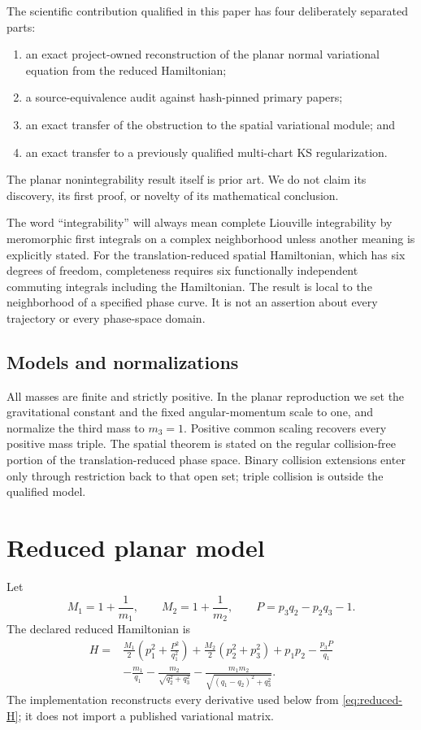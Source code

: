 \documentclass[11pt]{article}
\theoremstyle{definition}
\theoremstyle{remark}
\begin{document}
The scientific contribution qualified in this paper has four deliberately
separated parts:
\begin{enumerate}
  \item an exact project-owned reconstruction of the planar normal
    variational equation from the reduced Hamiltonian;
  \item a source-equivalence audit against hash-pinned primary papers;
  \item an exact transfer of the obstruction to the spatial variational
    module; and
  \item an exact transfer to a previously qualified multi-chart KS
    regularization.
\end{enumerate}
The planar nonintegrability result itself is prior art.  We do not claim its
discovery, its first proof, or novelty of its mathematical conclusion.

The word ``integrability'' will always mean complete Liouville integrability
by meromorphic first integrals on a complex neighborhood unless another
meaning is explicitly stated.  For the translation-reduced spatial
Hamiltonian, which has six degrees of freedom, completeness requires six
functionally independent commuting integrals including the Hamiltonian.
The result is local to the neighborhood of a specified phase curve.  It is
not an assertion about every trajectory or every phase-space domain.

\subsection{Models and normalizations}

All masses are finite and strictly positive.  In the planar reproduction we
set the gravitational constant and the fixed angular-momentum scale to one,
and normalize the third mass to \(m_3=1\).  Positive common scaling recovers
every positive mass triple.  The spatial theorem is stated on the regular
collision-free portion of the translation-reduced phase space.  Binary
collision extensions enter only through restriction back to that open set;
triple collision is outside the qualified model.

\section{Reduced planar model}
\label{sec:planar-model}

Let
\[
  M_1=1+\frac{1}{m_1},\qquad
  M_2=1+\frac{1}{m_2},\qquad
  P=p_3q_2-p_2q_3-1.
\]
The declared reduced Hamiltonian is
\begin{align}
H={}&\frac{M_1}{2}\left(p_1^2+\frac{P^2}{q_1^2}\right)
  +\frac{M_2}{2}(p_2^2+p_3^2)+p_1p_2-\frac{p_3P}{q_1}
  \nonumber\\
 &-\frac{m_1}{q_1}
  -\frac{m_2}{\sqrt{q_2^2+q_3^2}}
  -\frac{m_1m_2}{\sqrt{(q_1-q_2)^2+q_3^2}} .
\label{eq:reduced-H}
\end{align}
The implementation reconstructs every derivative used below from
\eqref{eq:reduced-H}; it does not import a published variational matrix.
\end{document}
